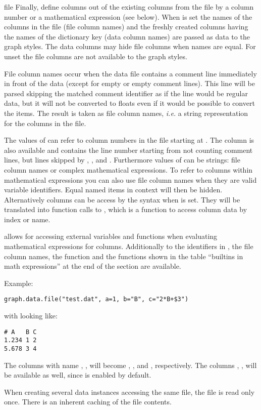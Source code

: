 \begin{classdesc}{file}
  Finally,  define columns out of the existing columns
  from the file by a column number or a mathematical expression (see
  below). When  is set the names of the columns in the file
  (file column names) and the freshly created columns having the names
  of the dictionary key (data column names) are passed as data to the
  graph styles. The data columns may hide file columns when names are
  equal. For unset  the file columns are not available to
  the graph styles.

  File column names occur when the data file contains a comment line
  immediately in front of the data (except for empty or empty comment
  lines). This line will be parsed skipping the matched comment
  identifier as if the line would be regular data, but it will not be
  converted to floats even if it would be possible to convert the
  items. The result is taken as file column names, \emph{i.e.} a
  string representation for the columns in the file.

  The values of  can refer to column numbers in the
  file starting at . The column  is also available
  and contains the line number starting from  not counting
  comment lines, but lines skipped by , ,
  and . Furthermore values of  can be
  strings: file column names or complex mathematical expressions. To
  refer to columns within mathematical expressions you can also use
  file column names when they are valid variable identifiers. Equal
  named items in context will then be hidden. Alternatively columns
  can be access by the syntax 
  when  is set. They will be translated into
  function calls to , which is a function to
  access column data by index or name.

   allows for accessing external variables and functions
  when evaluating mathematical expressions for columns. Additionally
  to the identifiers in , the file column names, the
   function and the functions shown in the table
  ``builtins in math expressions'' at the end of the section are
  available.

  Example:
  \begin{verbatim}
graph.data.file("test.dat", a=1, b="B", c="2*B+$3")
  \end{verbatim}
  with  looking like:
  \begin{verbatim}
# A   B C
1.234 1 2
5.678 3 4
  \end{verbatim}
  The columns with name , ,  will become
  , , and , respectively. The columns , ,
   will be available as well, since  is enabled by
  default.

  When creating several data instances accessing the same file,
  the file is read only once. There is an inherent caching of the
  file contents.
\end{classdesc}

